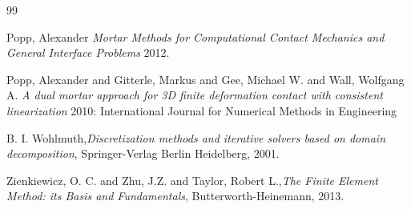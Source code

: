 \documentclass[a4paper,10pt]{article} %
\begin{document}
\begin{thebibliography}{99}

 Popp, Alexander {\em Mortar Methods for Computational Contact Mechanics and General Interface Problems}  2012.

  Popp, Alexander and Gitterle, Markus and Gee, Michael W. and Wall, Wolfgang A. {\em A dual mortar approach for 3D finite deformation contact with consistent linearization} 2010: International Journal for Numerical Methods in Engineering

 B. I. Wohlmuth,{\em Discretization methods and iterative solvers based on domain decomposition}, Springer-Verlag Berlin Heidelberg, 2001.

 Zienkiewicz, O. C. and Zhu, J.Z. and Taylor, Robert L.,{\em The Finite Element Method: its Basis and Fundamentals}, Butterworth-Heinemann, 2013.

\end{thebibliography}
\end{document}
